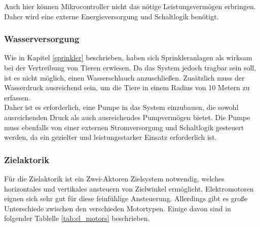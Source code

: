 Auch hier können Mikrocontroller nicht das nötige Leistungsvermögen erbringen. Daher wird eine externe Energieversorgung und Schaltlogik benötigt.

\subsubsection{Wasserversorgung}

Wie in Kapitel \ref{sprinkler} beschrieben, haben sich Sprinkleranlagen als wirksam bei der Vertreibung von Tieren erwiesen. Da das System jedoch tragbar sein soll, ist es nicht möglich, einen Wasserschlauch anzuschließen. Zusätzlich muss der Wasserdruck ausreichend sein, um die Tiere in einem Radius von 10 Metern zu erfassen.
\\
Daher ist es erforderlich, eine Pumpe in das System einzubauen, die sowohl ausreichenden Druck als auch ausreichendes Pumpvermögen bietet. Die Pumpe muss ebenfalls von einer externen Stromversorgung und Schaltlogik gesteuert werden, da ein gezielter und leistungsstarker Einsatz erforderlich ist.

\subsubsection{Zielaktorik}

Für die Zielaktorik ist ein Zwei-Aktoren Zielsystem notwendig, welches horizontales und vertikales ansteuern von Zielwinkel ermöglicht. Elektromotoren eignen sich sehr gut für diese feinfühlige Ansteuerung. Allerdings gibt es große Unterschiede zwischen den verschieden Motortypen. Einige davon sind in folgender Tablelle \ref{tab:el_motors} beschrieben.

